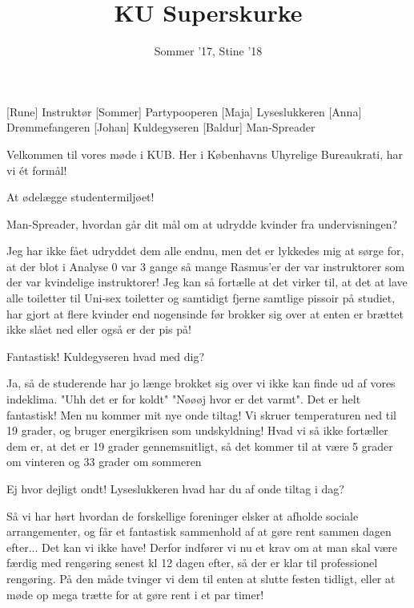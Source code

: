 \documentclass[a4paper,11pt]{article}
\title{KU Superskurke}
\author{Sommer '17, Stine '18}
\begin{document}
\maketitle

\begin{roles}
[Rune] Instruktør
[Sommer] Partypooperen
[Maja] Lyseslukkeren
[Anna] Drømmefangeren
[Johan] Kuldegyseren
[Baldur] Man-Spreader
\end{roles}



\begin{sketch}


 Velkommen til vores møde i KUB. Her i Københavns Uhyrelige Bureaukrati, har vi ét formål!

 At ødelægge studentermiljøet!

 Man-Spreader, hvordan går dit mål om at udrydde kvinder fra undervisningen?

 Jeg har ikke fået udryddet dem alle endnu, men det er lykkedes mig at sørge for, at der blot i Analyse 0 var 3 gange så mange Rasmus'er der var instruktorer som der var kvindelige instruktorer! Jeg kan så fortælle at det virker til, at det at lave alle toiletter til Uni-sex toiletter og samtidigt fjerne samtlige pissoir på studiet, har gjort at flere kvinder end nogensinde før brokker sig over at enten er brættet ikke slået ned eller også er der pis på! 

 Fantastisk! Kuldegyseren hvad med dig?

 Ja, så de studerende har jo længe brokket sig over vi ikke kan finde ud af vores indeklima. "Uhh det er for koldt" "Nøøøj hvor er det varmt". Det er helt fantastisk! Men nu kommer mit nye onde tiltag! Vi skruer temperaturen ned til 19 grader, og bruger energikrisen som undskyldning! Hvad vi så ikke fortæller dem er, at det er 19 grader gennemsnitligt, så det kommer til at være 5 grader om vinteren og 33 grader om sommeren 

 Ej hvor dejligt ondt! Lyseslukkeren hvad har du af onde tiltag i dag?

 Så vi har hørt hvordan de forskellige foreninger elsker at afholde sociale arrangementer, og får et fantastisk sammenhold af at gøre rent sammen dagen efter... Det kan vi ikke have! Derfor indfører vi nu et krav om at man skal være færdig med rengøring senest kl 12 dagen efter, så der er klar til professionel rengøring. På den måde tvinger vi dem til enten at slutte festen tidligt, eller at møde op mega trætte for at gøre rent i et par timer! 


\end{sketch}
\end{document}
